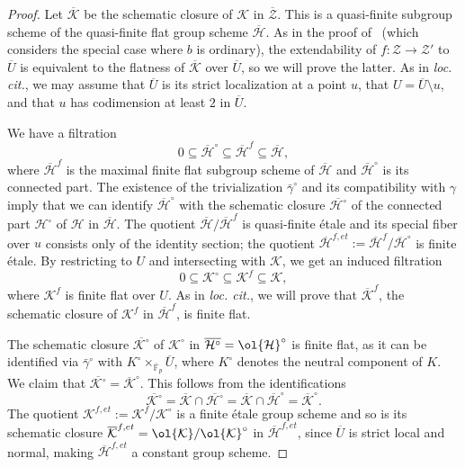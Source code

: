 \documentclass[letterpaper,11pt]{amsart}
\begin{document}
\begin{proof} Let $\overline{\mathcal{K}}$ be the schematic closure of $\mathcal{K}$ in $\overline{\mathcal{Z}}$. This is a quasi-finite subgroup scheme of the quasi-finite flat group scheme $\overline{\mathcal{H}}$. As in the proof of~\cite[Lemma 3.1.3.2]{lan-ordinary} (which considers the special case where $b$ is ordinary), the extendability of $f:\mathcal{Z}\to \mathcal{Z}'$ to $\overline{U}$ is equivalent to the flatness of $\overline{\mathcal{K}}$ over $\overline{U}$, so we will prove the latter. As in \emph{loc. cit.}, we may assume that $\overline{U}$ is its strict localization at a point $u$, that $U = \overline{U}\setminus u$, and that $u$ has codimension at least $2$ in $\overline{U}$. 

We have a filtration 
\[
0\subseteq \overline{\mathcal{H}}^\circ \subseteq \overline{\mathcal{H}}^f \subseteq \overline{\mathcal{H}},
\]
where $\overline{\mathcal{H}}^f$ is the maximal finite flat subgroup scheme of $\overline{\mathcal{H}}$ and $\overline{\mathcal{H}}^\circ$ is its connected part. The existence of the trivialization $\bar{\gamma}^\circ$ and its compatibility with $\gamma$ imply that we can identify $\overline{\mathcal{H}}^\circ$ with the schematic closure $\overline{\mathcal{H}^\circ}$ of the connected part $\mathcal{H}^\circ$ of $\mathcal{H}$ in $\overline{\mathcal{H}}$. The quotient $\overline{\mathcal{H}}/\overline{\mathcal{H}}^f$ is quasi-finite \'etale and its special fiber over $u$  consists only of the identity section; the quotient $\overline{\mathcal{H}}^{f,et}:=\overline{\mathcal{H}}^f/\overline{\mathcal{H}}^\circ$ is finite \'etale. By restricting to $U$ and intersecting with $\mathcal{K}$, we get an induced filtration 
\[
0\subseteq \mathcal{K}^\circ\subseteq \mathcal{K}^f\subseteq \mathcal{K}, 
\]
where $\mathcal{K}^f$ is finite flat over $U$. As in \emph{loc. cit.}, we will prove that $\overline{\mathcal{K}}^f$, the schematic closure of $\mathcal{K}^f$ in $\overline{\mathcal{H}}^f$, is finite flat. 

The schematic closure $\overline{\mathcal{K}^\circ}$ of $\mathcal{K}^\circ$ in $\overline{\mathcal{H}^\circ} = \ol{\mathcal{H}}^\circ$ is finite flat, as it can be identified via $\bar{\gamma}^\circ$ with $K^\circ\times_{\overline{\mathbb{F}}_p} \overline{U}$, where $K^{\circ}$ denotes the neutral component of $K$. We claim that $\overline{\mathcal{K}^\circ} = \overline{\mathcal{K}}^\circ$. This follows from the identifications 
\[
\overline{\mathcal{K}^\circ} = \overline{\mathcal{K}}\cap \overline{\mathcal{H}^\circ} = \overline{\mathcal{K}}\cap \overline{\mathcal{H}}^\circ = \overline{\mathcal{K}}^\circ.
\]
The quotient $\mathcal{K}^{f,et}:=\mathcal{K}^f/\mathcal{K}^\circ$ is a finite \'etale group scheme and so is its schematic closure $\overline{\mathcal{K}}^{f,et} = \ol{\mathcal{K}}/\ol{\mathcal{K}}^\circ$ in $\overline{\mathcal{H}}^{f,et}$, since $\overline{U}$ is strict local and normal, making $\overline{\mathcal{H}}^{f,et}$ a constant group scheme. 


\end{proof}
\end{document}
